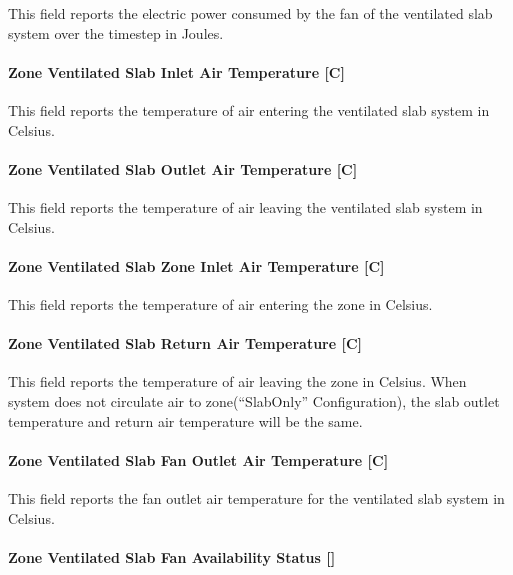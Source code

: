 This field reports the electric power consumed by the fan of the ventilated slab system over the timestep in Joules.

\paragraph{Zone Ventilated Slab Inlet Air Temperature {[}C{]}}\label{zone-ventilated-slab-inlet-air-temperature-c}

This field reports the temperature of air entering the ventilated slab system in Celsius.

\paragraph{Zone Ventilated Slab Outlet Air Temperature {[}C{]}}\label{zone-ventilated-slab-outlet-air-temperature-c}

This field reports the temperature of air leaving the ventilated slab system in Celsius.

\paragraph{Zone Ventilated Slab Zone Inlet Air Temperature {[}C{]}}\label{zone-ventilated-slab-zone-inlet-air-temperature-c}

This field reports the temperature of air entering the zone in Celsius.

\paragraph{Zone Ventilated Slab Return Air Temperature {[}C{]}}\label{zone-ventilated-slab-return-air-temperature-c}

This field reports the temperature of air leaving the zone in Celsius. When system does not circulate air to zone(``SlabOnly'' Configuration), the slab outlet temperature and return air temperature will be the same.

\paragraph{Zone Ventilated Slab Fan Outlet Air Temperature {[}C{]}}\label{zone-ventilated-slab-fan-outlet-air-temperature-c}

This field reports the fan outlet air temperature for the ventilated slab system in Celsius.

\paragraph{Zone Ventilated Slab Fan Availability Status {[]}}\label{zone-ventilated-slab-fan-availability-status}

